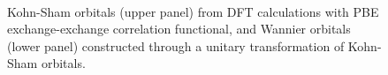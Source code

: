 \documentclass[prl,12pt,onecolumn,nofootinbib,notitlepage,english,superscriptaddress]{revtex4-1}
\begin{document}
\begin{figure}[hbt]
\centering
{}\quad
{}\quad
{}\quad
{}
\\
\quad
{}\quad
{}\quad
{}
\caption{Kohn-Sham orbitals (upper panel) from DFT calculations with PBE exchange-exchange correlation functional, and Wannier orbitals (lower panel) constructed through a unitary transformation of Kohn-Sham orbitals.}\label{fig:h4orb}
\end{figure}
\end{document}
